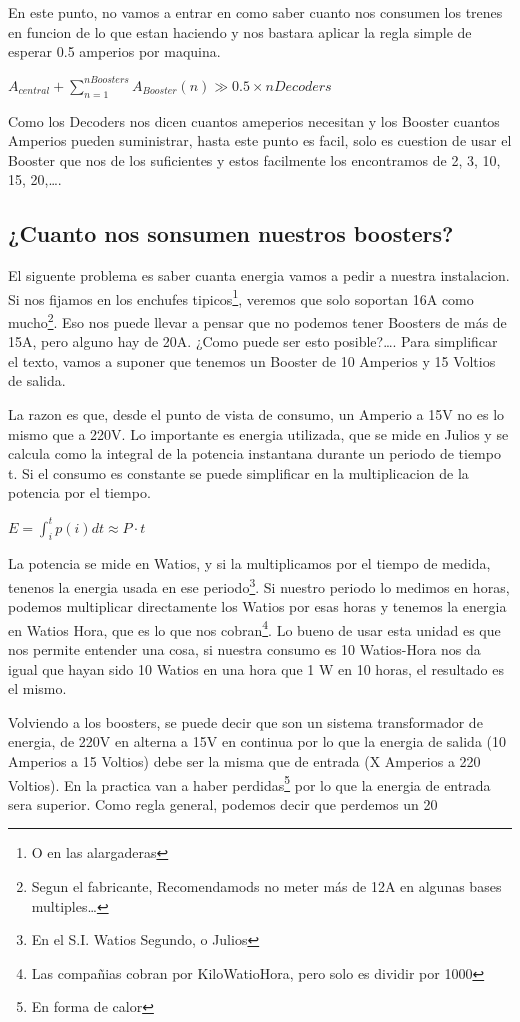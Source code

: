 En este punto, no vamos a entrar en como saber cuanto nos consumen los trenes en funcion de lo que estan haciendo y nos bastara aplicar la regla simple de esperar 0.5 amperios por maquina. 

$A_{central} + \sum_{n=1}^{nBoosters}A_{Booster}(n) \gg 0.5\times nDecoders $

Como los Decoders nos dicen cuantos ameperios necesitan y los Booster cuantos Amperios pueden suministrar, hasta este punto es facil, solo es cuestion de usar el Booster que nos de los suficientes y estos facilmente los encontramos de 2, 3, 10, 15, 20,\dots.
\subsection{¿Cuanto nos sonsumen nuestros boosters?}
El siguente problema es saber cuanta energia vamos a pedir a nuestra instalacion. 
Si nos fijamos en los enchufes tipicos\footnote{O en las alargaderas}, veremos que solo soportan 16A como mucho\footnote{Segun el fabricante, Recomendamods no meter más de 12A en algunas bases multiples\dots}. Eso nos puede llevar a pensar que no podemos tener Boosters de más de 15A, pero alguno hay de 20A. ¿Como puede ser esto posible?\dots. Para simplificar el texto, vamos a suponer que tenemos un Booster de 10 Amperios y 15 Voltios de salida.

La razon es que, desde el punto de vista de consumo, un Amperio a 15V no es lo mismo que a 220V. Lo importante es energia utilizada, que se mide en Julios y se calcula como la integral de la potencia instantana durante un periodo de tiempo t. Si el consumo es constante se puede simplificar en la multiplicacion de la potencia por el tiempo.

$ E= \int_{i}^{t}{p(i)dt} \approx P\cdot t$ 

La potencia se mide en Watios, y si la multiplicamos por el tiempo de medida, tenenos la energia usada en ese periodo\footnote{En el S.I. Watios Segundo, o Julios}. Si nuestro periodo lo medimos en horas, podemos multiplicar directamente los Watios por esas horas y tenemos la energia en Watios Hora, que es lo que nos cobran\footnote{Las compañias cobran por KiloWatioHora, pero solo es dividir por 1000}. Lo bueno de usar esta unidad es que nos permite entender una cosa, si nuestra consumo es 10 Watios-Hora nos da igual que hayan sido 10 Watios en una hora que 1 W en 10 horas, el resultado es el mismo.

Volviendo a los boosters, se puede decir que son un sistema transformador de energia, de 220V en alterna a 15V en continua por lo que la energia de salida (10 Amperios a 15 Voltios) debe ser la misma que de entrada (X Amperios a 220 Voltios). En la practica van a haber perdidas\footnote{En forma de calor} por lo que la energia de entrada sera superior. Como regla general, podemos decir que perdemos un 20%

